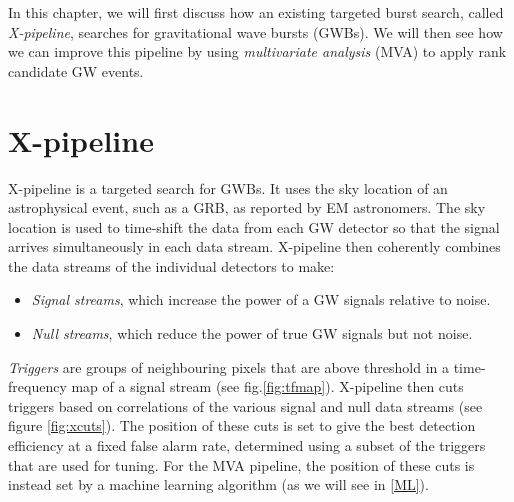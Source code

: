 \documentclass[11pt]{cuthesis}
\newcommand{\xp}{X-pipeline }
\begin{document}
In this chapter, we will first discuss how an existing targeted burst search, called \textit{X-pipeline}, searches for gravitational wave bursts (GWBs). We will then see how we can improve this pipeline by using \textit{multivariate analysis} (MVA) to apply rank candidate GW events.  

\section{X-pipeline} \label{xtriggers}
\xp is a targeted search for GWBs. It uses the sky location of an astrophysical event, such as a GRB, as reported by EM astronomers. The sky location is used to time-shift the data from each GW detector so that the signal arrives simultaneously in each data stream. \xp then coherently combines the data streams of the individual detectors to make:
\begin{itemize}
\item \textit{Signal streams}, which increase the power of a GW signals relative to noise.
\item \textit{Null streams}, which reduce the power of true GW signals but not noise.
\end{itemize}
\textit{Triggers} are groups of neighbouring pixels that are above threshold in a time-frequency map of a signal stream (see fig.\ref{fig:tfmap}). \xp  then cuts triggers based on correlations of the various signal and null data streams (see figure \ref{fig:xcuts}). The position of these cuts is set to give the best detection efficiency at a fixed false alarm rate, determined using a subset of the triggers that are used for tuning. For the MVA pipeline, the position of these cuts is instead set by a machine learning algorithm (as we will see in \ref{ML}).
\end{document}
